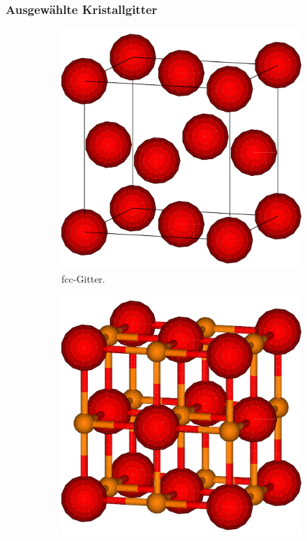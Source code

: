 \subsubsection{Ausgewählte Kristallgitter}
\begin{figure}
    \centering
    \begin{subfigure}[t]{0.3\textwidth}
        \centering
        \includegraphics[width=\textwidth]{../assets/theorie/fcc}
        \caption{fcc-Gitter.} \label{fcc}
    \end{subfigure}
    \begin{subfigure}[t]{0.3\textwidth}
        \centering
        \includegraphics[width=\textwidth]{../assets/theorie/rocksalt}

\end{subfigure}
\end{figure}
